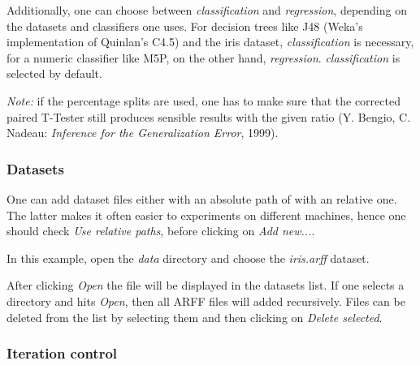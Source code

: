 \documentclass[a4paper]{article}
\begin{document}
Additionally, one can choose between \textit{classification} and \textit{regression}, depending on the datasets and classifiers one uses. For decision trees like J48 (Weka's implementation of Quinlan's C4.5) and the iris dataset, \textit{classification} is necessary, for a numeric classifier like M5P, on the other hand, \textit{regression}. \textit{classification} is selected by default.

\textit{Note:} if the percentage splits are used, one has to make sure that the corrected paired T-Tester still produces sensible results with the given ratio (Y. Bengio, C. Nadeau: \textit{Inference for the Generalization Error}, 1999).


\subsubsection{Datasets}

One can add dataset files either with an absolute path of with an relative one. The latter makes it often easier to experiments on different machines, hence one should check \textit{Use relative paths}, before clicking on \textit{Add new...}.

\begin{center}
\end{center}


In this example, open the \textit{data} directory and choose the \textit{iris.arff} dataset.

\begin{center}
\end{center}


After clicking \textit{Open} the file will be displayed in the datasets list. If one selects a directory and hits \textit{Open}, then all ARFF files will added recursively. Files can be deleted from the list by selecting them and then clicking on \textit{Delete selected}.

\begin{center}
\end{center}


\subsubsection{Iteration control}
\end{document}
